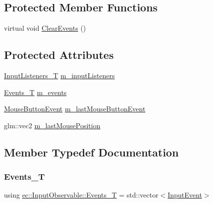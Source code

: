 \subsection*{Protected Member Functions}
\begin{DoxyCompactItemize}
\item 
virtual void \mbox{\hyperlink{classec_1_1_input_observable_a5af16f48a5bdca46229a6b5bc7769e2d}{Clear\+Events}} ()
\end{DoxyCompactItemize}
\subsection*{Protected Attributes}
\begin{DoxyCompactItemize}
\item 
\mbox{\hyperlink{classec_1_1_input_observable_a99717b2918621597db89d9ede34ddded}{Input\+Listeners\+\_\+T}} \mbox{\hyperlink{classec_1_1_input_observable_aa11756df5cac4e93ace9db3f6c8817c4}{m\+\_\+input\+Listeners}}
\item 
\mbox{\hyperlink{classec_1_1_input_observable_a9b63c8acbcbfc0f99d2964493ac52925}{Events\+\_\+T}} \mbox{\hyperlink{classec_1_1_input_observable_af83e9f99bec60cdce82b129fa457c6ab}{m\+\_\+events}}
\item 
\mbox{\hyperlink{structec_1_1_mouse_button_event}{Mouse\+Button\+Event}} \mbox{\hyperlink{classec_1_1_input_observable_adaecb6c67b919793de0a178810b54f96}{m\+\_\+last\+Mouse\+Button\+Event}}
\item 
glm\+::vec2 \mbox{\hyperlink{classec_1_1_input_observable_ae6fefe31977d17fd0ef4ab394433b08d}{m\+\_\+last\+Mouse\+Position}}
\end{DoxyCompactItemize}


\subsection{Member Typedef Documentation}
\mbox{\label{classec_1_1_input_observable_a9b63c8acbcbfc0f99d2964493ac52925}} 
\subsubsection{\texorpdfstring{Events\+\_\+T}{Events\_T}}
{\footnotesize\ttfamily using \mbox{\hyperlink{classec_1_1_input_observable_a9b63c8acbcbfc0f99d2964493ac52925}{ec\+::\+Input\+Observable\+::\+Events\+\_\+T}} =  std\+::vector$<$\mbox{\hyperlink{structec_1_1_input_event}{Input\+Event}}$>$}

